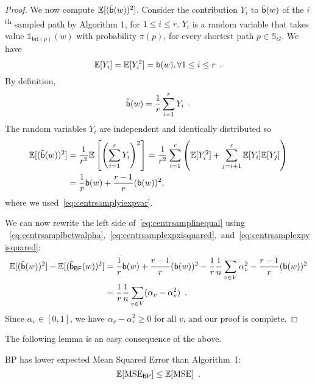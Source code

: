 \begin{proof}
We now compute $\mathbb{E}[(\tilde{\mathsf{b}}(w))^2]$. 
Consider the contribution $Y_i$ to $\tilde{\mathsf{b}}(w)$ of the
$i$\textsuperscript{th} sampled path by Algorithm 1, for $1\le i\le r$. $Y_i$ is a random variable that takes value
$\mathds{1}_{\mathsf{Int}(p)}(w)$ with probability $\pi(p)$, for every shortest
path $p\in\mathbb{S}_G$. We have
\begin{equation}\label{eq:centrsamplyiexpvar}
  \mathbb{E}[Y_i]=\mathbb{E}[Y_i^2]=\mathsf{b}(w), \forall 1\le i \le r\enspace.
\end{equation}
By definition, 
\[
\tilde{\mathsf{b}}(w)=\frac{1}{r}\sum_{i=1}^rY_i\enspace.
\]
The random variables $Y_i$ are independent and identically distributed so
\begin{align}\label{eq:centrsamplexpyisquared}
  \mathbb{E}[(\tilde{\mathsf{b}}(w))^2]&=\frac{1}{r^2}\mathbb{E}\left[\left(\sum_{i=1}^r
  Y_i\right)^2\right]=\frac{1}{r^2}\sum_{i=1}^r\left(\mathbb{E}[Y_i^2]+\sum_{j=i+1}^r\mathbb{E}[Y_i]\mathbb{E}[Y_j]\right)\nonumber\\
  &=\frac{1}{r}\mathsf{b}(w)+\frac{r-1}{r}(\mathsf{b}(w))^2,
\end{align}
where we used~\eqref{eq:centrsamplyiexpvar}.

We can now rewrite the left side of~\eqref{eq:centrsamplinequal} using
~\eqref{eq:centrsamplbetwalpha},~\eqref{eq:centrsamplexpxisquared},~and~\eqref{eq:centrsamplexpyisquared}:
\begin{align*}
  \mathbb{E}[(\tilde{\mathsf{b}}(w))^2]-\mathbb{E}[(\tilde{\mathsf{b}}_\mathsf{BF}(w))^2] &=
  \frac{1}{r}\mathsf{b}(w)+\frac{r-1}{r}(\mathsf{b}(w))^2 - \frac{1}{r}\frac{1}{n}\sum_{v\in
    V}\alpha_v^2
   -\frac{r-1}{r}(\mathsf{b}(w))^2 \\
   &= \frac{1}{r}\frac{1}{n}\sum_{v\in V}(\alpha_v - \alpha_v^2)\enspace. 
\end{align*}
Since $\alpha_v\in[0,1]$, we have $\alpha_v-\alpha_v^2\ge 0$ for all $v$, and our proof
is complete.
\end{proof}

The following lemma is an easy consequence of the above.

\begin{lemma}\label{lem:MSE}
  \textsf{BP} has lower expected Mean Squared Error than Algorithm~1:
  \[
  \mathbb{E}[\mathrm{MSE}_\mathsf{BP}]\le \mathbb{E}[\mathrm{MSE}]\enspace.
  \]
\end{lemma}

